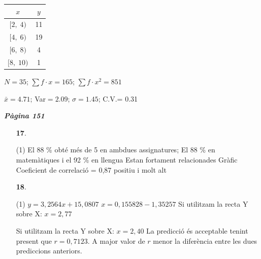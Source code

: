 \documentclass[a4paper, pdf, twoside]{book}
\begin{document}
\begin{multicols}{2}
\begin{enumerate}
\begin {tabular}{|c|c|}\hline \rowcolor {lightgray} $x$ & $y$ \\\hline $[2,\;4 )$ & 11\\ \hline $[4,\;6 )$ & 19\\ \hline $[6,\;8 )$ & 4\\ \hline $[8,\;10 )$ & 1\\ \hline \end {tabular} \par $N= 35 $; $\sum f\cdot x= 165 $; $\sum f\cdot x^2= 851 $ \par $\bar x= 4.71 $; Var$= 2.09 $; $\sigma = 1.45 $; C.V.= 0.31 \par {} 
 \end{enumerate}
\vspace{0.3cm}


{\textbf{\em Pàgina 151}} \hrulefill
\begin{enumerate}
\vspace{0.25cm}



 \item[\fontfamily{phv}\selectfont\color{blue}\textbf{17}. ] 
 \begin{tasks}[column-sep=1em, item-indent=1.3333em](1)
	 \task El 88 \% obté més de 5 en ambdues assignatures; El 88 \% en matemàtiques i el 92 \% en llengua
	 \task Estan fortament relacionades
	 \task Gràfic
	 \task Coeficient de correlació = 0,87 positiu i molt alt
\end{tasks}
 \end{enumerate}
\begin{enumerate}
\vspace{0.25cm}



 \item[\fontfamily{phv}\selectfont\color{blue}\textbf{18}. ] 
 \begin{tasks}[column-sep=1em, item-indent=1.3333em](1)
	 \task $y=3,2564 x + 15,0807$
	 \task $x=0,155828 - 1,35257$
	 \task Si utilitzam la recta Y sobre X: $x=2,77$ \par Si utilitzam la recta Y sobre X: $x=2,40$
	 \task La predicció és acceptable tenint present que $r=0,7123$. A major valor de $r$ menor la diferència entre les dues prediccions anteriors. \par {}
\end{tasks}
\vspace{0.25cm}



\end{enumerate}
\end{multicols}
\end{document}
